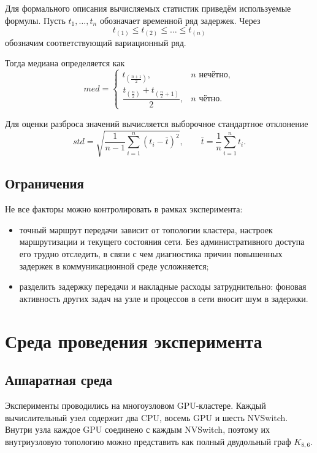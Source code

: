 \documentclass[a4paper,14pt]{extarticle}
\begin{document}
Для формального описания вычисляемых статистик приведём используемые формулы. Пусть \(t_1,\dots,t_n\) обозначает временной ряд задержек. Через
\[
t_{(1)} \le t_{(2)} \le \dots \le t_{(n)}
\]
обозначим соответствующий вариационный ряд.

Тогда медиана определяется как
\[
med=
\begin{cases}
t_{\left(\frac{n+1}{2}\right)}, & n \text{ нечётно},\\[4pt]
\dfrac{t_{\left(\frac{n}{2}\right)} + t_{\left(\frac{n}{2}+1\right)}}{2}, & n \text{ чётно}.
\end{cases}
\]

Для оценки разброса значений вычисляется выборочное стандартное отклонение
\[
std=\sqrt{\frac{1}{n-1}\sum_{i=1}^{n}(t_i-\bar t)^2},
\qquad
\bar t=\frac{1}{n}\sum_{i=1}^{n}t_i.
\]

\subsection{Ограничения}

Не все факторы можно контролировать в рамках эксперимента:
\begin{itemize}
	\item точный маршрут передачи зависит от топологии кластера, настроек маршрутизации и текущего состояния сети. Без административного доступа его трудно отследить, в связи с чем диагностика причин повышенных задержек в коммуникационной среде усложняется;

	\item разделить задержку передачи и накладные расходы затруднительно: фоновая активность других задач на узле и процессов в сети вносит шум в задержки.
\end{itemize}

\newpage

\section{Среда проведения эксперимента}

\subsection{Аппаратная среда}

Эксперименты проводились на многоузловом GPU-кластере. Каждый вычислительный узел содержит два CPU, восемь GPU и шесть NVSwitch. Внутри узла каждое GPU соединено с каждым NVSwitch, поэтому их внутриузловую топологию можно представить как полный двудольный граф $K_{8,6}$.
\end{document}
